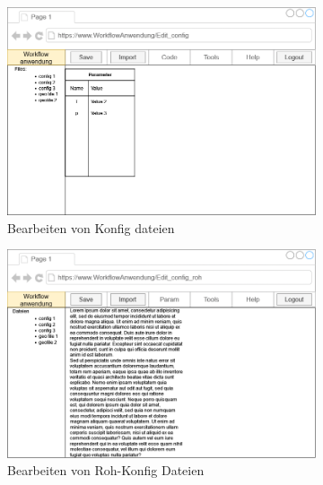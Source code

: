 \begin{figure}[ht]
    \centering
    \begin{subfigure}{.75\textwidth}
        \centering
        \includegraphics[width = \textwidth]{Grafiken/Gui Mockups/workflowGui-ConfigEdit.drawio.png}
    \caption{Bearbeiten von Konfig dateien}
    \label{fig: sfigKonfig}
    \end{subfigure}
   \begin{subfigure}{.75\textwidth}
    \centering
    \includegraphics[width = \textwidth]{Grafiken/Gui Mockups/workflowGui-ConfigEditRohdata.drawio.png}
    \caption{Bearbeiten von Roh-Konfig Dateien}
    \label{fig:sfigRawConfig}
   \end{subfigure}
   \begin{subfigure}{.75\textwidth}
        \centering

\end{subfigure}
\end{figure}
